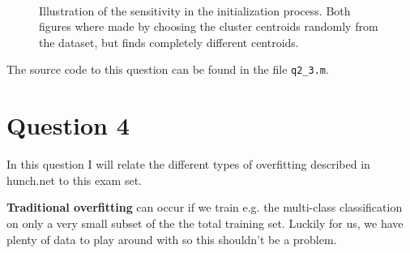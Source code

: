\documentclass[10pt]{article}
\begin{document}
\begin{figure}[ht]
\centering
\mbox{
     \quad
}                    
\caption{Illustration of the sensitivity in the initialization process. Both figures where made by choosing the cluster centroids randomly from the dataset, but finds completely different centroids.}
\label{label}
\end{figure}

The source code to this question can be found in the file \texttt{q2\_3.m}.


\section*{Question 4} %
\label{sec:question_4}
In this question I will relate the different types of overfitting described in hunch.net\cite{hunch} to this exam set.

\textbf{Traditional overfitting} can occur if we train e.g. the multi-class classification on only a very small subset of the the total training set. Luckily for us, we have plenty of data to play around with so this shouldn't be a problem.
\end{document}
